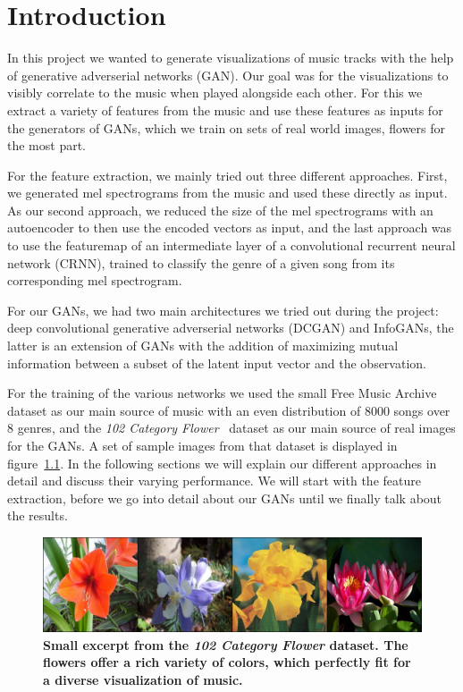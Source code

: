 \chapter{Introduction}
    In this project we wanted to generate visualizations of music tracks with the help of generative adverserial networks (GAN). Our goal was for the visualizations to visibly correlate to the music when played alongside each other. For this we extract a variety of features from the music and use these features as inputs for the generators of GANs, which we train on sets of real world images, flowers for the most part.

    For the feature extraction, we mainly tried out three different approaches. First, we generated mel spectrograms from the music and used these directly as input. As our second approach, we reduced the size of the mel spectrograms with an autoencoder to then use the encoded vectors as input, and the last approach was to use the featuremap of an intermediate layer of a convolutional recurrent neural network (CRNN), trained to classify the genre of a given song from its corresponding mel spectrogram.

    For our GANs, we had two main architectures we tried out during the project: deep convolutional generative adverserial networks (DCGAN) and InfoGANs, the latter is an extension of GANs with the addition of maximizing mutual information between a subset of the latent input vector and the observation.

    For the training of the various networks we used the small Free Music Archive~\cite{FMA} dataset as our main source of music with an even distribution of 8000 songs over 8 genres, and the \textit{102 Category Flower}~\cite{102flower} dataset as our main source of real images for the GANs. A set of sample images from that dataset is displayed in figure~\ref{fig:flowers}. In the following sections we will explain our different approaches in detail and discuss their varying performance. We will start with the feature extraction, before we go into detail about our GANs until we finally talk about the results.

    \begin{figure}
        \centering
        \includegraphics[width=\textwidth]{images/real_samples}
        \caption{\textbf{Small excerpt from the \textit{102 Category Flower} dataset. The flowers offer a rich variety of colors, which perfectly fit for a diverse visualization of music.}}
        \label{fig:flowers}
    \end{figure}